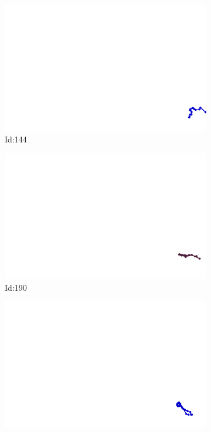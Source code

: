 \documentclass[12pt,twoside]{report}
\begin{document}
\begin{figure}
\centering
\begin{subfigure}[b]{0.20\textwidth}
\centering
\includegraphics[width=\textwidth]{../../trajectories/144.png}
\caption{Id:144}
\end{subfigure}
\begin{subfigure}[b]{0.20\textwidth}
\centering
\includegraphics[width=\textwidth]{../../trajectories/190.png}
\caption{Id:190}
\end{subfigure}
\begin{subfigure}[b]{0.20\textwidth}
\centering
\includegraphics[width=\textwidth]{../../trajectories/242.png}

\end{subfigure}
\end{figure}
\end{document}
